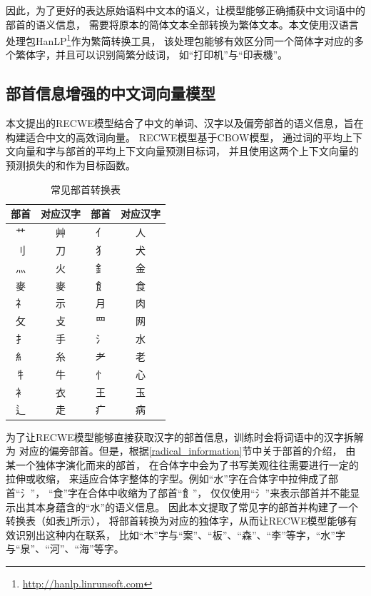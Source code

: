 因此，为了更好的表达原始语料中文本的语义，让模型能够正确捕获中文词语中的部首的语义信息，
需要将原本的简体文本全部转换为繁体文本。本文使用汉语言处理包HanLP\footnote{\url{http://hanlp.linrunsoft.com}}作为繁简转换工具，
该处理包能够有效区分同一个简体字对应的多个繁体字，并且可以识别简繁分歧词，
如“打印机”与“印表機”。


\subsection{部首信息增强的中文词向量模型}
\label{recwe_section}
本文提出的RECWE模型结合了中文的单词、汉字以及偏旁部首的语义信息，旨在构建适合中文的高效词向量。
RECWE模型基于CBOW模型，
通过词的平均上下文向量和字与部首的平均上下文向量预测目标词，
并且使用这两个上下文向量的预测损失的和作为目标函数。
\begin{table}[h]
    \caption{常见部首转换表}
    \begin{tabular}{|c|c|c|c|}
        \hline
        部首 & 对应汉字 & 部首 & 对应汉字 \\
        \hline
        艹 & 艸 & 亻 & 人\\
        \hline
        刂 & 刀 & 犭 & 犬\\
        \hline
        灬 & 火 & 釒 & 金\\
        \hline
        麥 & 麥 & 飠 & 食\\
        \hline
        礻 & 示 & 月 & 肉\\
        \hline
        攵 & 攴 & 罒 & 网\\
        \hline
        扌 & 手 & 氵 & 水\\
        \hline
        糹 & 糸 & 耂 & 老\\
        \hline
        牜 & 牛 & 忄 & 心\\
        \hline
        衤 & 衣 & 王 & 玉\\
        \hline
        辶 & 走 & 疒 & 病\\
        \hline
    \end{tabular}
    \label{char_tran_form}
    \end{table}

为了让RECWE模型能够直接获取汉字的部首信息，训练时会将词语中的汉字拆解为
对应的偏旁部首。但是，根据\ref{radical_information}节中关于部首的介绍，
由某一个独体字演化而来的部首，
在合体字中会为了书写美观往往需要进行一定的拉伸或收缩，
来适应合体字整体的字型。例如“水”字在合体字中拉伸成了部首“氵”，
“食”字在合体中收缩为了部首“飠”，
仅仅使用“氵”来表示部首并不能显示出其本身蕴含的“水”的语义信息。
因此本文提取了常见字的部首并构建了一个转换表（如表\ref{char_tran_form}所示），
将部首转换为对应的独体字，从而让RECWE模型能够有效识别出这种内在联系，
比如“木”字与“案”、“板”、“森”、“李”等字，“水”字与“泉”、“河”、“海”等字。

